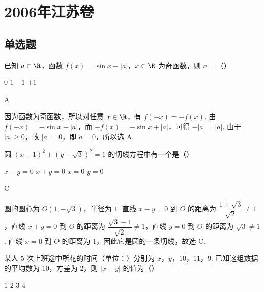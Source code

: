 
\chapter{2006年江苏卷}
\section{单选题}
\begin{problem}
已知 \(a \in \R\)，函数 \(f(x) = \sin x - |a|\)，\(x \in \R\) 为奇函数，则 \(a =\)（\quad）

\choices
    {\(0\)}
    {\(1\)}
    {\(-1\)}
    {\(\pm1\)}
\end{problem}

\begin{answer}
A
\end{answer}

\begin{solution}
因为函数为奇函数，所以对任意 \(x\in\R\)，有 \(f(-x)=-f(x)\). 由 \(f(-x)=-\sin x-|a|\)，而 \(-f(x)=-\sin x+|a|\)，可得 \(-|a|=|a|\). 由于 \(|a|\geqslant0\)，故 \(|a|=0\)，即 \(a=0\)，所以选 A.
\end{solution}

\begin{problem}
圆 \((x - 1)^2 + (y + \sqrt{3})^2 = 1\) 的切线方程中有一个是（\quad）

\choices
    {\(x - y = 0\)}
    {\(x + y = 0\)}
    {\(x = 0\)}
    {\(y = 0\)}
\end{problem}

\begin{answer}
C
\end{answer}

\begin{solution}
圆的圆心为 \(O(1,-\sqrt{3})\)，半径为 \(1\). 直线 \(x-y=0\) 到 \(O\) 的距离为 \(\dfrac{1+\sqrt{3}}{\sqrt{2}}\neq1\)，直线 \(x+y=0\) 到 \(O\) 的距离为 \(\dfrac{\sqrt{3}-1}{\sqrt{2}}\neq1\)，直线 \(y=0\) 到 \(O\) 的距离为 \(\sqrt{3}\neq1\). 直线 \(x=0\) 到 \(O\) 的距离为 \(1\)，因此它是圆的一条切线，故选 C.
\end{solution}

\begin{problem}
某人 \(5\) 次上班途中所花的时间（单位：）分别为 \(x\)，\(y\)，\(10\)，\(11\)，\(9\). 已知这组数据的平均数为 \(10\)，方差为 \(2\)，则 \(|x - y|\) 的值为（\quad）

\choices
    {\(1\)}
    {\(2\)}
    {\(3\)}
    {\(4\)}
\end{problem}


